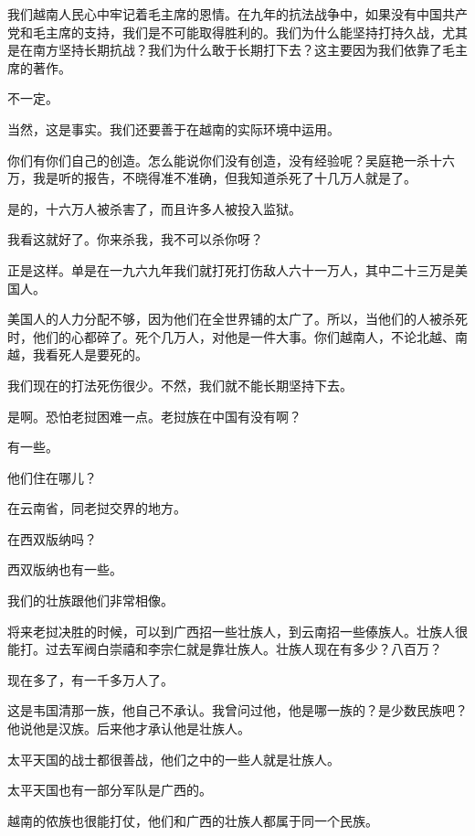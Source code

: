 我们越南人民心中牢记着毛主席的恩情。在九年的抗法战争中，如果没有中国共产党和毛主席的支持，我们是不可能取得胜利的。我们为什么能坚持打持久战，尤其是在南方坚持长期抗战？我们为什么敢于长期打下去？这主要因为我们依靠了毛主席的著作。

不一定。

当然，这是事实。我们还要善于在越南的实际环境中运用。

你们有你们自己的创造。怎么能说你们没有创造，没有经验呢？吴庭艳一杀十六万，我是听的报告，不晓得准不准确，但我知道杀死了十几万人就是了。

是的，十六万人被杀害了，而且许多人被投入监狱。

我看这就好了。你来杀我，我不可以杀你呀？

正是这样。单是在一九六九年我们就打死打伤敌人六十一万人，其中二十三万是美国人。

美国人的人力分配不够，因为他们在全世界铺的太广了。所以，当他们的人被杀死时，他们的心都碎了。死个几万人，对他是一件大事。你们越南人，不论北越、南越，我看死人是要死的。

我们现在的打法死伤很少。不然，我们就不能长期坚持下去。

是啊。恐怕老挝困难一点。老挝族在中国有没有啊？

有一些。

他们住在哪儿？

在云南省，同老挝交界的地方。

在西双版纳吗？

西双版纳也有一些。

我们的壮族跟他们非常相像。

将来老挝决胜的时候，可以到广西招一些壮族人，到云南招一些傣族人。壮族人很能打。过去军阀白崇禧和李宗仁就是靠壮族人。壮族人现在有多少？八百万？

现在多了，有一千多万人了。

这是韦国清那一族，他自己不承认。我曾问过他，他是哪一族的？是少数民族吧？他说他是汉族。后来他才承认他是壮族人。

太平天国的战士都很善战，他们之中的一些人就是壮族人。

太平天国也有一部分军队是广西的。

越南的侬族也很能打仗，他们和广西的壮族人都属于同一个民族。

